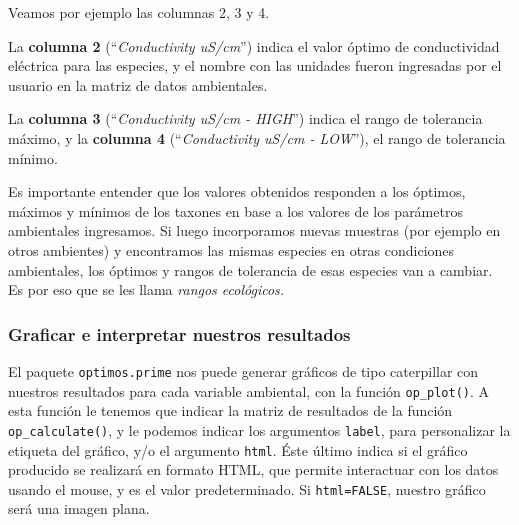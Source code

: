 \documentclass[
]{book}
\begin{document}
Veamos por ejemplo las columnas 2, 3 y 4.

La \textbf{columna 2} (``\emph{Conductivity uS/cm}'') indica el valor óptimo de conductividad eléctrica para las especies, y el nombre con las unidades fueron ingresadas por el usuario en la matriz de datos ambientales.

La \textbf{columna 3} (``\emph{Conductivity uS/cm - HIGH}'') indica el rango de tolerancia máximo, y la \textbf{columna 4} (``\emph{Conductivity uS/cm - LOW}''), el rango de tolerancia mínimo.

Es importante entender que los valores obtenidos responden a los óptimos, máximos y mínimos de los taxones en base a los valores de los parámetros ambientales ingresamos. Si luego incorporamos nuevas muestras (por ejemplo en otros ambientes) y encontramos las mismas especies en otras condiciones ambientales, los óptimos y rangos de tolerancia de esas especies van a cambiar. Es por eso que se les llama \emph{rangos ecológicos.}

\hypertarget{graficar-e-interpretar-nuestros-resultados}{%
\subsubsection{Graficar e interpretar nuestros resultados}\label{graficar-e-interpretar-nuestros-resultados}}

El paquete \texttt{optimos.prime} nos puede generar gráficos de tipo caterpillar con nuestros resultados para cada variable ambiental, con la función \texttt{op\_plot()}. A esta función le tenemos que indicar la matriz de resultados de la función \texttt{op\_calculate()}, y le podemos indicar los argumentos \texttt{label}, para personalizar la etiqueta del gráfico, y/o el argumento \texttt{html}. Éste último indica si el gráfico producido se realizará en formato HTML, que permite interactuar con los datos usando el mouse, y es el valor predeterminado. Si \texttt{html=FALSE}, nuestro gráfico será una imagen plana.
\end{document}
